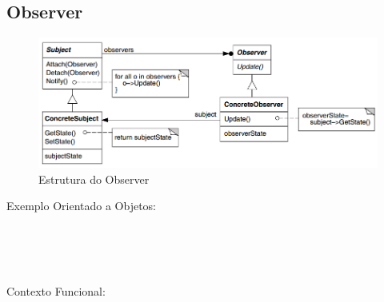 \subsection{Observer}

\begin{figure}[htb]
	\caption{\label{fig_grafico}Estrutura do Observer}
	\begin{center}
	    \includegraphics[scale=0.5]{5_padroes-contexto-funcional/5.3_comportamentais/5.3.07_observer/diagram.png}
	\end{center}
\end{figure}

Exemplo Orientado a Objetos:

\begin{lstlisting}[caption={Observer Orientação a Objetos},label=ooobserver]


    
\end{lstlisting}

Contexto Funcional:


\begin{lstlisting}[caption={Observer Funcional},label=fpobserver]
    

    
\end{lstlisting}